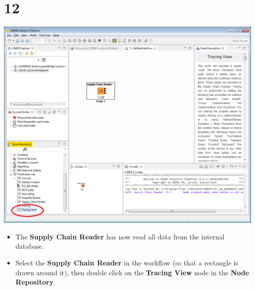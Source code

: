 \documentclass[10pt]{beamer}
\begin{document}
\section{12}
\begin{frame}
	\begin{center}
  		\includegraphics[height=0.6\textheight]{12.png}
	\end{center}
	\begin{itemize}
		\item The \textbf{Supply Chain Reader} has now read all data from the internal database.
		\item Select the \textbf{Supply Chain Reader} in the workflow (so that a rectangle is drawn around it), then double click on the \textbf{Tracing View} node in the \textbf{Node Repository}.
	\end{itemize}
\end{frame}
\end{document}
